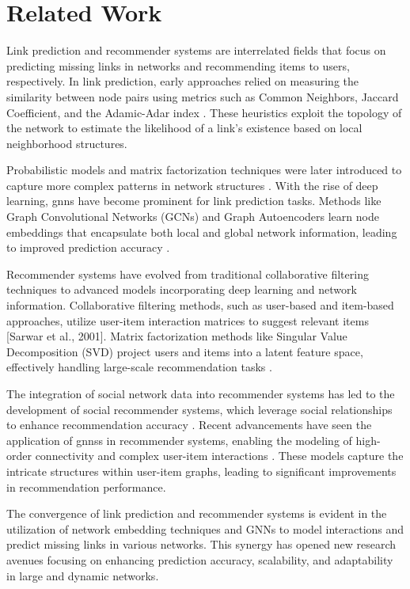 \documentclass[11pt]{article}
\begin{document}
\section{Related Work}\label{sec:related-work}

Link prediction and recommender systems are interrelated fields that focus on predicting missing links in networks 
and recommending items to users, respectively. In link prediction, early approaches relied on measuring the similarity 
between node pairs using metrics such as Common Neighbors, Jaccard Coefficient, and the Adamic-Adar index 
\cite{liben2003link}. These heuristics exploit the topology of the network to estimate the likelihood 
of a link's existence based on local neighborhood structures.

Probabilistic models and matrix factorization techniques were later introduced to capture more complex 
patterns in network structures \cite{koren2009matrix}. With the rise of deep learning, \acp{gnn} have become 
prominent for link prediction tasks. Methods like Graph Convolutional Networks (GCNs) and 
Graph Autoencoders learn node embeddings that encapsulate both local and global network information, 
leading to improved prediction accuracy \cite{kipf2016semi}.

Recommender systems have evolved from traditional collaborative filtering techniques to advanced models 
incorporating deep learning and network information. Collaborative filtering methods, such as user-based 
and item-based approaches, utilize user-item interaction matrices to suggest relevant items [Sarwar et al., 2001]. 
Matrix factorization methods like Singular Value Decomposition (SVD) project users and items into a latent feature 
space, effectively handling large-scale recommendation tasks \cite{sarwar2001item}.

The integration of social network data into recommender systems has led to the development of social recommender 
systems, which leverage social relationships to enhance recommendation accuracy \cite{jamali2010matrix}. 
Recent advancements have seen the application of \acp{gnn}s in recommender systems, enabling the modeling of high-order 
connectivity and complex user-item interactions \cite{wang2019neural}. These models capture the intricate structures 
within user-item graphs, leading to significant improvements in recommendation performance.

The convergence of link prediction and recommender systems is evident in the utilization of network embedding 
techniques and GNNs to model interactions and predict missing links in various networks. This synergy has opened new 
research avenues focusing on enhancing prediction accuracy, scalability, and adaptability in large and dynamic networks.
\end{document}

